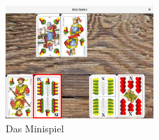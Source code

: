 \documentclass{scrreprt}
\begin{document}
	\begin{figure}
		\centering
		\includegraphics[width=0.5\textwidth]{mini.png}
		\caption{Das Minispiel}
	\end{figure}
\end{document}
